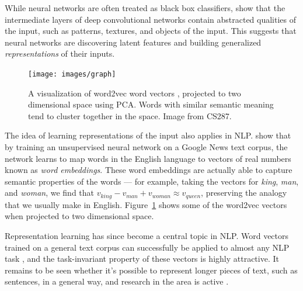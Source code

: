 \documentclass[12pt]{report}
\begin{document}
While neural networks are often treated as black box classifiers, \citet{Zeiler2014} show that the intermediate layers of deep convolutional networks contain abstracted qualities of the input, such as patterns, textures, and objects of the input. This suggests that neural networks are discovering latent features and building generalized \emph{representations} of their inputs.

\begin{figure}[p]
\centering
\texttt{[image: images/graph]}
\caption[Word2vec Clusters]{A visualization of word2vec word vectors \citep{mikolov2013word2vec}, projected to two dimensional space using PCA. Words with similar semantic meaning tend to cluster together in the space. Image from CS287.}
\label{fig:word2vec}
\end{figure}

The idea of learning representations of the input also applies in NLP.
\citet{mikolov2013word2vec} show that by training an unsupervised neural network on a Google News text corpus, the network learns to map words in the English language to vectors of real numbers known as \emph{word embeddings}.
These word embeddings are actually able to capture semantic properties of the words --- for example, taking the vectors for \emph{king}, \emph{man}, and \emph{woman}, we find that $v_{king} - v_{man} + v_{woman} \approx v_{queen}$, preserving the analogy that we usually make in English. Figure~\ref{fig:word2vec} shows some of the word2vec vectors when projected to two dimensional space.

Representation learning has since become a central topic in NLP. Word vectors trained on a general text corpus can successfully be applied to almost any NLP task \citep{mikolov2013word2vec, Pennington2014}, and the task-invariant property of these vectors is highly attractive.
It remains to be seen whether it's possible to represent longer pieces of text, such as sentences, in a general way, and research in the area is active \citep{Bowman2016}.

%
%
%
%
%
%
\end{document}
